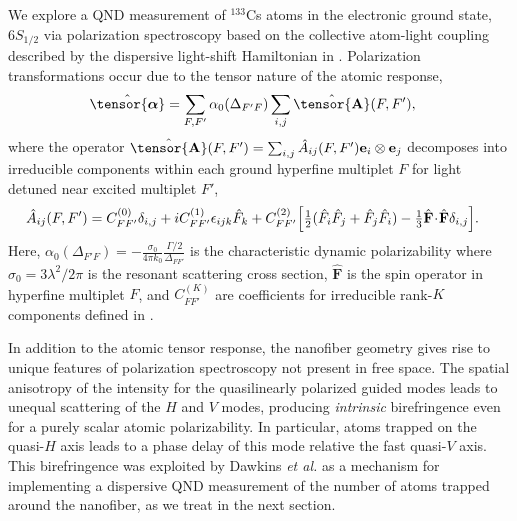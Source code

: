 \documentclass[preprint, aps,pra,onecolumn]{revtex4-1} %
\newcommand{\poltens}{\hat{\tensor{\boldsymbol{\alpha}}}}
\newcommand{\charpol}{\alpha_0(\Delta_{F'F})}
\begin{document}
We explore a QND measurement of ${}^{133}$Cs atoms in the electronic ground state, $6S_{1/2}$ via polarization spectroscopy based on the collective atom-light coupling described by the dispersive light-shift Hamiltonian in . Polarization transformations occur due to the tensor nature of the atomic response,
	\begin{align} \label{Eq::Polarizability}
		\poltens &=  \sum_{F,F'} \charpol \sum_{i,j} \hat{\tensor{\mbf{A}}}(F,F'),
	\end{align}
where the operator $\hat{\tensor{\mbf{A}}}(F,F') = \sum_{i,j} \hat{A}_{ij}(F,F')\mathbf{e}_i \otimes \mathbf{e}_j$ decomposes into irreducible components within each ground hyperfine multiplet $F$ for light detuned near excited multiplet $F'$,  
	\begin{align} \label{Eq::PolarizabilityIrrep}
		\hat{A}_{ij}(F,F')&=  C_{FF'}^{(0)} \delta_{i,j}+ iC_{FF'}^{(1)}\epsilon_{ijk}\hat{F}_k+ C_{FF'}^{(2)} \Big[ \mbox{$\frac{1}{2}$} ( \hat{F}_i\hat{F}_j +\hat{F}_j\hat{F}_i )-\mbox{$\frac{1}{3}$} \hat{\mathbf{F}}\!\cdot\!\hat{\mathbf{F}} \delta_{i,j} \Big]. 
\end{align}
Here, $\charpol = -\frac{\sigma_0}{4\pi k_0}\frac{\Gamma/2 }{\Delta_{FF'}}$ is the characteristic dynamic polarizability where $\sigma_0 = 3 \lambda^2/2\pi$ is the resonant scattering cross section, $\hat{\mathbf{F}}$ is the spin operator in hyperfine multiplet $F$, and $C_{FF'}^{(K)}$ are coefficients for irreducible rank-$K$ components defined in \cite{deutsch_quantum_2010}. 

In addition to the atomic tensor response, the nanofiber geometry gives rise to unique features of polarization spectroscopy not present in free space.  The spatial anisotropy of the intensity for the quasilinearly polarized guided modes leads to unequal scattering of the $H$ and $V$ modes, producing \emph{intrinsic} birefringence even for a purely scalar atomic polarizability.  
In particular, atoms trapped on the quasi-$H$ axis leads to a phase delay of this mode relative the fast quasi-$V$ axis. 
This birefringence was exploited by Dawkins {\em et al.} \cite{dawkins_dispersive_2011} as a mechanism for implementing a dispersive QND measurement of the number of atoms trapped around the nanofiber, as we treat in the next section. 
\end{document}
